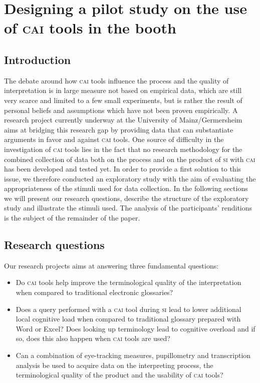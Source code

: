 \documentclass[output=paper]{langsci/langscibook}
\begin{document}
\section{Designing a pilot study on the use of \textsc{cai} tools in the booth}\label{sec:prandi:3}
\subsection{Introduction}\label{sec:prandi:3.1}
The debate around how \textsc{cai} tools influence the process and the quality of interpretation is in large measure not based on empirical data, which are still very scarce and limited to a few small experiments, but is rather the result of personal beliefs and assumptions which have not been proven empirically. A research project currently underway at the University of Mainz/Germersheim \citep{Prandi2016, Prandi2017a, Prandi2017b} aims at bridging this research gap by providing data that can substantiate arguments in favor and against \textsc{cai} tools. One source of difficulty in the investigation of \textsc{cai} tools lies in the fact that no research methodology for the combined collection of data both on the process and on the product of \textsc{si} with \textsc{cai} has been developed and tested yet. In order to provide a first solution to this issue, we therefore conducted an exploratory study with the aim of evaluating the appropriateness of the stimuli used for data collection. In the following sections we will present our research questions, describe the structure of the exploratory study and illustrate the stimuli used. The analysis of the participants’ renditions is the subject of the remainder of the paper.

\subsection{Research questions}\label{sec:prandi:3.2}
Our research projects aims at answering three fundamental questions:

\begin{itemize}
\item Do \textsc{cai} tools help improve the terminological quality of the interpretation when compared to traditional electronic glossaries?
\item Does a query performed with a \textsc{cai} tool during \textsc{si} lead to lower additional local cognitive load when compared to traditional glossary prepared with Word or Excel? Does looking up terminology lead to cognitive overload and if so, does this also happen when \textsc{cai} tools are used?
\item Can a combination of eye-tracking measures, pupillometry and transcription analysis be used to acquire data on the interpreting process, the terminological quality of the product and the usability of \textsc{cai} tools?
\end{itemize}
\end{document}
